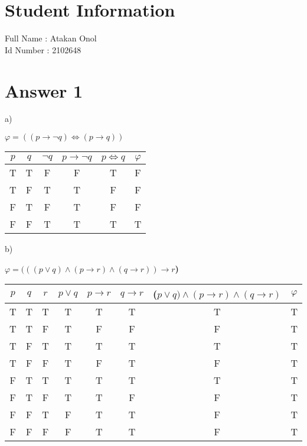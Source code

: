 \documentclass[12pt]{article}
\begin{document}
\section*{Student Information }
Full Name : Atakan Onol \\
Id Number : 2102648 \\

\section*{Answer 1}

a)
\begin{table}[H]
    \small
    \centering
    \textbf{$\varphi = ((p \rightarrow \neg q) \iff (p \rightarrow q))$} \\
    \begin{tabular}{|c|c|c|c|c|c|}
        \hline
            \textbf{$p$} & \textbf{$q$} & \textbf{$\neg q$} & \textbf{$p \rightarrow \neg q$} & \textbf{$p \iff q$} & \textbf{$\varphi$} \\
        \hline
        \hline
            T & T & F & F & T & F \\
            T & F & T & T & F & F \\
            F & T & F & T & F & F \\
            F & F & T & T & T & T \\
        \hline
    \end{tabular}
\end{table}

\noindent
b)
\begin{table}[H]
    \small
    \centering
    \textbf{$\varphi = (((p \vee q) \wedge (p \rightarrow r) \wedge (q \rightarrow r)) \rightarrow r$)} \\
    \begin{tabular}{|c|c|c|c|c|c|c|c|}
        \hline
            \textbf{$p$} & \textbf{$q$} & \textbf{$r$} & \textbf{$p \vee q$} & \textbf{$p \rightarrow r$} & \textbf{$q \rightarrow r$} & \textbf{($p \vee q) \wedge (p \rightarrow r) \wedge (q \rightarrow r)$} & \textbf{$\varphi$} \\
        \hline
        \hline
                T & T & T & T & T & T & T & T \\
                T & T & F & T & F & F & F & T \\
                T & F & T & T & T & T & T & T \\
                T & F & F & T & F & T & F & T \\
                F & T & T & T & T & T & T & T \\
                F & T & F & T & T & F & F & T \\
                F & F & T & F & T & T & F & T \\
                F & F & F & F & T & T & F & T \\
        \hline
    \end{tabular}
\end{table}
    
\end{document}
